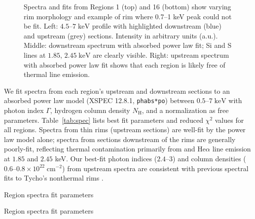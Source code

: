 \documentclass[iop, apj, numberedappendix]{emulateapj}
\newcommand*{\mt}{\mathrm}
\newcommand*{\unit}[1]{\;\mt{#1}}  %
\begin{document}
\begin{figure*}
    \caption{Spectra and fits from Regions 1 (top) and 16 (bottom) show varying
    rim morphology and example of rim where 0.7--1 keV peak could not be fit.
    Left: $4.5$--$7 \unit{keV}$ profile with highlighted downstream (blue) and
    upstream (grey) sections.  Intensity in arbitrary units (a.u.).  Middle:
    downstream spectrum with absorbed power law fit; Si and S lines at $1.85$,
    $2.45 \unit{keV}$ are clearly visible.  Right: upstream spectrum with
    absorbed power law fit shows that each region is likely free of thermal
    line
emission.}
    \label{fig:spec}
\end{figure*}

We fit spectra from each region's upstream and downstream sections to an
absorbed power law model (XSPEC 12.8.1, \texttt{phabs*po}) between $0.5$--$7
\unit{keV}$ with photon index $\Gamma$, hydrogen column density $N_{\mt{H}}$,
and a normalization as free parameters.  Table~\ref{tab:spec} lists best fit
parameters and reduced $\chi^2$ values for all regions.  Spectra from thin rims
(upstream sections) are well-fit by the power law model alone; spectra from
sections downstream of the rims are generally poorly-fit, reflecting thermal
contamination primarily from  and  He$\alpha$ line
emission at $1.85$ and $2.45$ keV.  Our best-fit photon indices ($2.4$--$3$)
and column densities ($0.6$--$0.8 \times 10^{22} \unit{cm^{-2}}$) from upstream
spectra are consistent with previous spectral fits to Tycho's nonthermal rims
\citep{hwang2002, cassam-chenai2007}.

\begin{table}
    \scriptsize
    \centering
    \caption{Region spectra fit parameters\label{tab:spec}}
    
\end{table}

\begin{table*}
    \footnotesize
    \centering
    \caption{Region spectra fit parameters\label{tab:spec-pt2}}
    
\end{table*}

\end{document}
